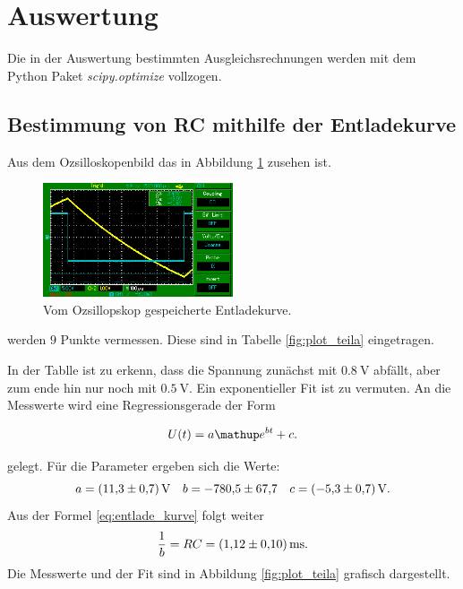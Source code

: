 \section{Auswertung}
Die in der Auswertung bestimmten Ausgleichsrechnungen werden mit
dem Python Paket \emph{scipy.optimize} vollzogen. %

\subsection{Bestimmung von RC mithilfe der Entladekurve}

Aus dem Ozsilloskopenbild das in Abbildung \ref{fig:entladekurve} zusehen ist. %

\begin{figure}
  \centering
  \includegraphics[width=0.5\textwidth]{pics/bilda_508hz.png}
  \caption{Vom Ozsillopskop gespeicherte Entladekurve.}
  \label{fig:entladekurve}
\end{figure}
werden  $9$ Punkte vermessen.
Diese sind in Tabelle \ref{fig:plot_teila} eingetragen.
\FloatBarrier

\FloatBarrier
In der Tablle ist zu erkenn, dass die Spannung zunächst mit $\SI{0.8}{\volt}$ %
abfällt, aber zum ende hin nur noch mit $\SI{0.5}{\volt}$. %
Ein exponentieller Fit ist zu vermuten. %
An die Messwerte wird eine Regressionsgerade der Form %

\begin{equation*}
  U(t)=a\map{e}^{bt}+c.
\end{equation*}

gelegt.
Für die Parameter ergeben sich die Werte:
\begin{equation}
  \label{eq:parameter_teila}
a=\SI{11.3\pm0.7}{\volt} \quad b=\num{-780.5\pm67.7} \quad c=\SI{-5.3\pm0.7}{\volt}. %
\end{equation}
Aus der Formel  \eqref{eq:entlade_kurve} folgt weiter
\begin{equation}
  \frac{1}{b}=RC=\SI{1.12\pm0.1}{\milli\second}.
\end{equation}
Die Messwerte und der Fit sind in Abbildung \ref{fig:plot_teila} grafisch
dargestellt.



